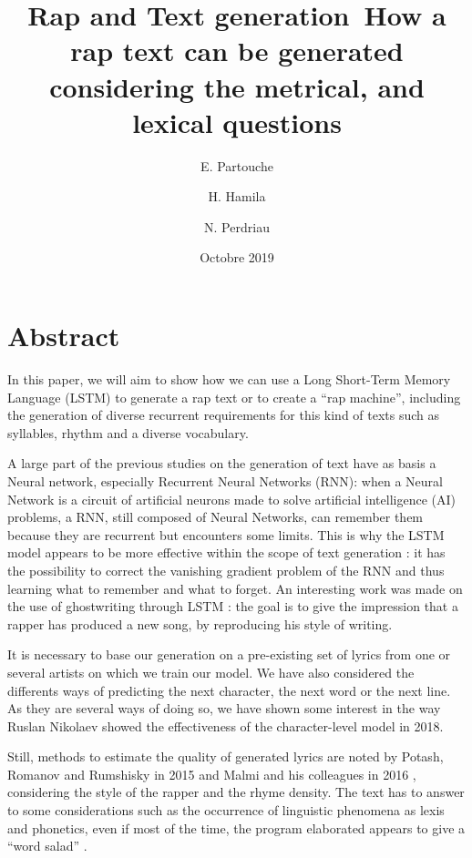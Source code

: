 \documentclass[12pt,a4paper]{article}
\title{Rap and Text generation\newline\ How a rap text can be generated considering the metrical, and lexical questions}
\date{Octobre 2019}
\author{E. Partouche \and H. Hamila \and N. Perdriau}
\begin{document}
\maketitle
\tableofcontents
\newpage

\section{Abstract}

In this paper, we will aim to show how we can use a Long Short-Term Memory Language (LSTM) to generate a rap text or to create a “rap machine”, including the generation of diverse recurrent requirements for this kind of texts such as syllables, rhythm and a diverse vocabulary. \newline

A large part of the previous studies on the generation of text \cite{sutskever_generating_nodate} have as basis a Neural network, especially Recurrent Neural Networks (RNN): when a Neural Network is a circuit of artificial neurons made to solve artificial intelligence (AI) problems, a RNN, still composed of Neural Networks, can remember them because they are recurrent but encounters some limits. This is why the LSTM model appears to be more effective within the scope of text generation \cite{chollet_deep_2018} \cite{raiman_nano_2015} \cite{surma_text_2018} : it has the possibility to correct the vanishing gradient problem of the RNN and thus learning what to remember and what to forget. An interesting work was made on the use of ghostwriting through LSTM  \cite{potash_ghostwriter:_2015} : the goal is to give the impression that a rapper has produced a new song, by reproducing his style of writing. \newline

It is necessary to base our generation on a pre-existing set of lyrics from one or several artists on which we train our model. We have also considered the differents ways of predicting the next character, the next word or the next line. As they are several ways of doing so, we have shown some interest in the way Ruslan Nikolaev \cite{nikolaev_generating_2018} \cite{nikolaev_drake-lyric-generator_2018} showed the effectiveness of the character-level model in 2018. \newline

Still, methods to estimate the quality of generated lyrics are noted by Potash, Romanov and Rumshisky in 2015 and Malmi and his colleagues in 2016 \cite{malmi_dopelearning:_2016}, considering the style of the rapper and the rhyme density. The text has to answer to some considerations such as the occurrence of linguistic phenomena as lexis and phonetics, even if most of the time, the program elaborated appears to give a “word salad”   \cite{oliveira_automatic_nodate} \cite{paupier_how_2018}. \newline
\end{document}
